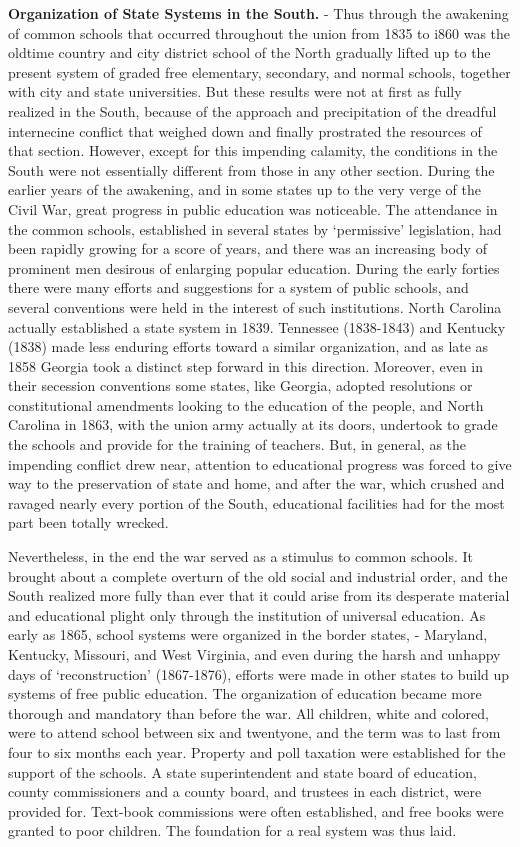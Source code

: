 \documentclass[
]{book}
\begin{document}
\textbf{Organization of State Systems in the South.} - Thus through the awakening of common schools that occurred throughout the union from 1835 to i860 was the oldtime country and city district school of the North gradually lifted up to the present system of graded free elementary, secondary, and normal schools, together with city and state universities. But these results were not at first as fully realized in the South, because of the approach and precipitation of the dreadful internecine conflict that weighed down and finally prostrated the resources of that section. However, except for this impending calamity, the conditions in the South were not essentially different from those in any other section. During the earlier years of the awakening, and in some states up to the very verge of the Civil War, great progress in public education was noticeable. The attendance in the common schools, established in several states by `permissive' legislation, had been rapidly growing for a score of years, and there was an increasing body of prominent men desirous of enlarging popular education. During the early forties there were many efforts and suggestions for a system of public schools, and several conventions were held in the interest of such institutions. North Carolina actually established a state system in 1839. Tennessee (1838-1843) and Kentucky (1838) made less enduring efforts toward a similar organization, and as late as 1858 Georgia took a distinct step forward in this direction. Moreover, even in their secession conventions some states, like Georgia, adopted resolutions or constitutional amendments looking to the education of the people, and North Carolina in 1863, with the union army actually at its doors, undertook to grade the schools and provide for the training of teachers. But, in general, as the impending conflict drew near, attention to educational progress was forced to give way to the preservation of state and home, and after the war, which crushed and ravaged nearly every portion of the South, educational facilities had for the most part been totally wrecked.

Nevertheless, in the end the war served as a stimulus to common schools. It brought about a complete overturn of the old social and industrial order, and the South realized more fully than ever that it could arise from its desperate material and educational plight only through the institution of universal education. As early as 1865, school systems were organized in the border states, - Maryland, Kentucky, Missouri, and West Virginia, and even during the harsh and unhappy days of `reconstruction' (1867-1876), efforts were made in other states to build up systems of free public education. The organization of education became more thorough and mandatory than before the war. All children, white and colored, were to attend school between six and twentyone, and the term was to last from four to six months each year. Property and poll taxation were established for the support of the schools. A state superintendent and state board of education, county commissioners and a county board, and trustees in each district, were provided for. Text-book commissions were often established, and free books were granted to poor children. The foundation for a real system was thus laid.
\end{document}
